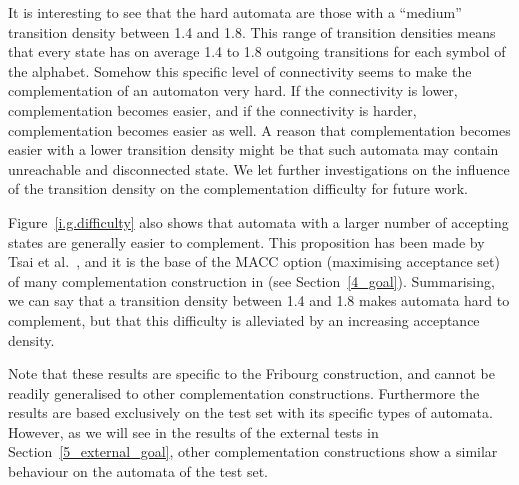 It is interesting to see that the hard automata are those with a ``medium'' transition density between 1.4 and 1.8. This range of transition densities means that every state has on average 1.4 to 1.8 outgoing transitions for each symbol of the alphabet. Somehow this specific level of connectivity seems to make the complementation of an automaton very hard. If the connectivity is lower, complementation becomes easier, and if the connectivity is harder, complementation becomes easier as well. A reason that complementation becomes easier with a lower transition density might be that such automata may contain unreachable and disconnected state. We let further investigations on the influence of the transition density on the complementation difficulty for future work.

Figure~\ref{i.g.difficulty} also shows that automata with a larger number of accepting states are generally easier to complement. This proposition has been made by Tsai et al.~\cite{2011_tsai}, and it is the base of the MACC option (maximising acceptance set) of many complementation construction in \goal{} (see Section~\ref{4_goal}). Summarising, we can say that a transition density between 1.4 and 1.8 makes automata hard to complement, but that this difficulty is alleviated by an increasing acceptance density.

Note that these results are specific to the Fribourg construction, and cannot be readily generalised to other complementation constructions. Furthermore the results are based exclusively on the \goal{} test set with its specific types of automata. However, as we will see in the results of the external tests in Section~\ref{5_external_goal}, other complementation constructions show a similar behaviour on the automata of the \goal{} test set.



